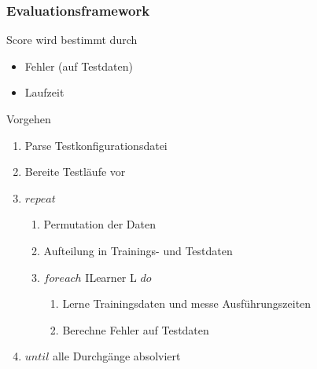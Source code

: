 \documentclass[18pt]{beamer}
\begin{document}
	\begin{frame}[allowframebreaks]\frametitle{Evaluationsframework}
		\begin{block}{Score}
			wird bestimmt durch
		    \begin{itemize}
		    	\item Fehler (auf Testdaten)
		    	\item Laufzeit
		    \end{itemize}
		\end{block}
	\framebreak
		\begin{block}{Vorgehen}
		    \begin{enumerate}
				\item Parse Testkonfigurationsdatei
				\item Bereite Testläufe vor
				\item $repeat$
				\begin{enumerate}
					\item Permutation der Daten				
					\item Aufteilung in Trainings- und Testdaten
					\item $foreach$ ILearner L $do$
					\begin{enumerate}
						\item Lerne Trainingsdaten und messe Ausführungszeiten
						\item Berechne Fehler auf Testdaten
					\end{enumerate}
				\end{enumerate}
				\item $until$ alle Durchgänge absolviert
		    \end{enumerate}
		\end{block}
	\end{frame}
	
\end{document}
